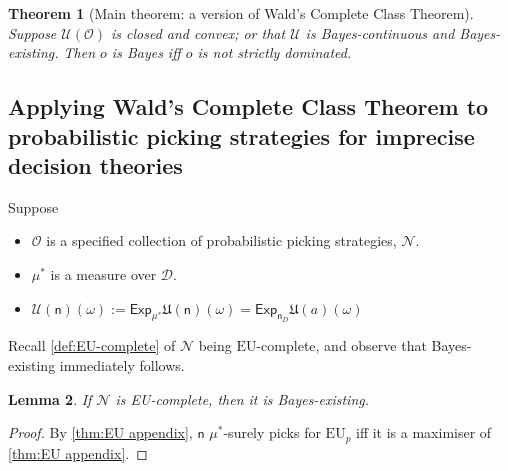 \documentclass[a4paper]{article}
\newtheorem{theorem}{Theorem}
\newtheorem{lemma}[theorem]{Lemma}
\newcommand\Exp{\mathsf{Exp}}
\newcommand\EU{\mathrm{EU}}
\renewcommand\O{\mathcal{O}}
\newcommand\U{\mathfrak{U}} %
\newcommand\Uwald{\mathcal{U}} %
\newcommand{\D}{\mathcal{D}}
\newcommand{\n}{\mathsf{n}}
\newcommand\Nu{\mathcal{N}}
\newcommand{\todoold}[2][]{\todo[backgroundcolor=white,bordercolor=orange!10,linecolor=gray!10, #1,caption={},textcolor=gray]{Pre-rev: #2}}
\newcommand{\todooldinfo}[2][]{\todoold[#1]{#2}}
\newenvironment{CCM rewritten}
{\begingroup\color{blue}} %
{\endgroup}              %
\begin{document}
\begin{theorem}[Main theorem: a version of Wald's Complete Class Theorem]
	Suppose $\Uwald(\O)$ is closed and convex; or that $\Uwald$ is Bayes-continuous and Bayes-existing. Then $o$ is Bayes iff $o$ is not strictly dominated.
\end{theorem}
\subsection{Applying Wald's Complete Class Theorem to probabilistic picking strategies for imprecise decision theories}

Suppose
\begin{itemize}
\item $\O$ is a specified collection of probabilistic picking strategies, $\Nu$.
\item $\mu^*$ is a measure over $\D$.
\item $\Uwald(\n)(\omega):=\Exp_{\mu^*}\U(\n)(\omega)=\Exp_{\n_{D}} \U(a)(\omega)$
\end{itemize}

Recall \cref{def:EU-complete} of $\Nu$ being $\EU$-complete, and observe that Bayes-existing immediately follows. 
\begin{lemma}\label{thm:cct-appln:existing}
	If $\Nu$ is EU-complete, then it is Bayes-existing. 
\end{lemma}
\begin{proof}
	By \cref{thm:EU appendix}, $\n$ ${\mu^*}$-surely picks for $\EU_p$ iff it is a maximiser of  \cref{thm:EU appendix}. %
\end{proof}
\end{document}
